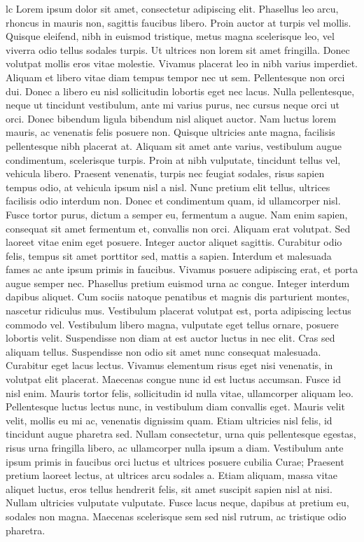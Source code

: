 \documentclass{article}
\begin{document}
lc
\newpage
\beginnumbering
\pstart
Lorem ipsum dolor sit amet, consectetur adipiscing elit. Phasellus leo arcu, rhoncus in mauris non, sagittis faucibus libero. Proin auctor at turpis vel mollis. Quisque eleifend, nibh in euismod tristique, metus magna scelerisque leo, vel viverra odio tellus sodales turpis. Ut ultrices non lorem sit amet fringilla. Donec volutpat mollis eros vitae molestie. Vivamus placerat leo in nibh varius imperdiet. Aliquam et libero vitae diam tempus tempor nec ut sem.
\pend
\pstart
Pellentesque non orci dui. Donec a libero eu nisl sollicitudin lobortis eget nec lacus. Nulla pellentesque, neque ut tincidunt vestibulum, ante mi varius purus, nec cursus neque orci ut orci. Donec bibendum ligula bibendum nisl aliquet auctor. Nam luctus lorem mauris, ac venenatis felis posuere non. Quisque ultricies ante magna, facilisis pellentesque nibh placerat at. Aliquam sit amet ante varius, vestibulum augue condimentum, scelerisque turpis. Proin at nibh vulputate, tincidunt tellus vel, vehicula libero. Praesent venenatis, turpis nec feugiat sodales, risus sapien tempus odio, at vehicula ipsum nisl a nisl. Nunc pretium elit tellus, ultrices facilisis odio interdum non. Donec et condimentum quam, id ullamcorper nisl.
\pend
\pstart
Fusce tortor purus, dictum a semper eu, fermentum a augue. Nam enim sapien, consequat sit amet fermentum et, convallis non orci. Aliquam erat volutpat. Sed laoreet vitae enim eget posuere. Integer auctor aliquet sagittis. Curabitur odio felis, tempus sit amet porttitor sed, mattis a sapien. Interdum et malesuada fames ac ante ipsum primis in faucibus. Vivamus posuere adipiscing erat, et porta augue semper nec.
\pend
\pstart
Phasellus pretium euismod urna ac congue. Integer interdum dapibus aliquet. Cum sociis natoque penatibus et magnis dis parturient montes, nascetur ridiculus mus. Vestibulum placerat volutpat est, porta adipiscing lectus commodo vel. Vestibulum libero magna, vulputate eget tellus ornare, posuere lobortis velit. Suspendisse non diam at est auctor luctus in nec elit. Cras sed aliquam tellus. Suspendisse non odio sit amet nunc consequat malesuada. Curabitur eget lacus lectus. Vivamus elementum risus eget nisi venenatis, in volutpat elit placerat. Maecenas congue nunc id est luctus accumsan. Fusce id nisl enim.
\pend
\pstart
Mauris tortor felis, sollicitudin id nulla vitae, ullamcorper aliquam leo. Pellentesque luctus lectus nunc, in vestibulum diam convallis eget. Mauris velit velit, mollis eu mi ac, venenatis dignissim quam. Etiam ultricies nisl felis, id tincidunt augue pharetra sed. Nullam consectetur, urna quis pellentesque egestas, risus urna fringilla libero, ac ullamcorper nulla ipsum a diam. Vestibulum ante ipsum primis in faucibus orci luctus et ultrices posuere cubilia Curae; Praesent pretium laoreet lectus, at ultrices arcu sodales a. Etiam aliquam, massa vitae aliquet luctus, eros tellus hendrerit felis, sit amet suscipit sapien nisl at nisi. Nullam ultricies vulputate vulputate. Fusce lacus neque, dapibus at pretium eu, sodales non magna. Maecenas scelerisque sem sed nisl rutrum, ac tristique odio pharetra.
\end{document}
